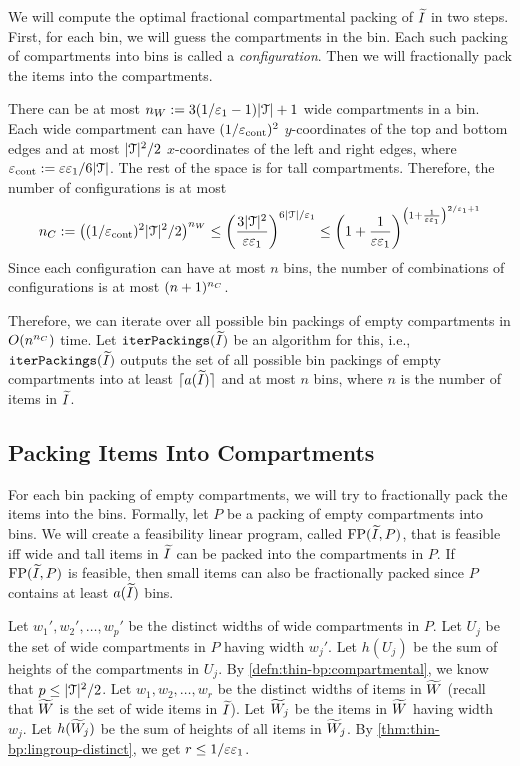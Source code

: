 We will compute the optimal fractional compartmental packing of $\widetilde{I}$ in two steps.
First, for each bin, we will guess the compartments in the bin.
Each such packing of compartments into bins is called a \emph{configuration}.
Then we will fractionally pack the items into the compartments.

There can be at most $n_W := 3(1/\varepsilon_1-1)|\mathcal{T}| + 1$ wide compartments in a bin.
Each wide compartment can have $(1/\varepsilon_{\mathrm{cont}})^2$ $y$-coordinates
of the top and bottom edges and at most $|\mathcal{T}|^2/2$ $x$-coordinates
of the left and right edges, where $\varepsilon_{\mathrm{cont}} := \varepsilon\varepsilon_1/6|\mathcal{T}|$.
The rest of the space is for tall compartments.
Therefore, the number of configurations is at most
\[ n_C := \left((1/\varepsilon_{\mathrm{cont}})^2|\mathcal{T}|^2/2\right)^{n_W}
    \le \left(\frac{3|\mathcal{T}|^2}{\varepsilon\varepsilon_1}\right)^{6|\mathcal{T}|/\varepsilon_1}
    \le \left(1+\frac{1}{\varepsilon\varepsilon_1}\right)^{
        \left(1+\frac{1}{\varepsilon\varepsilon_1}\right)^{2/\varepsilon_1 + 1}} \]
Since each configuration can have at most $n$ bins, the number of combinations
of configurations is at most $(n+1)^{n_C}$.

Therefore, we can iterate over all possible bin packings of empty compartments in $O(n^{n_C})$ time.
Let $\operatorname{\mathtt{iterPackings}}(\widetilde{I})$ be an algorithm for this, i.e.,
$\operatorname{\mathtt{iterPackings}}(\widetilde{I})$ outputs the set of all possible bin packings of empty compartments into
at least $\lceil a(\widetilde{I}) \rceil$ and at most $n$ bins,
where $n$ is the number of items in $\widetilde{I}$.

\subsection{Packing Items Into Compartments}
\label{sec:feas-lp}

For each bin packing of empty compartments, we will try to
fractionally pack the items into the bins.
Formally, let $P$ be a packing of empty compartments into bins.
We will create a feasibility linear program, called $\operatorname{FP}(\widetilde{I}, P)$,
that is feasible iff wide and tall items in $\widetilde{I}$ can be packed
into the compartments in $P$.
If $\operatorname{FP}(\widetilde{I}, P)$ is feasible, then small items can also be
fractionally packed since $P$ contains at least $a(\widetilde{I})$ bins.

Let $w_1', w_2', \ldots, w_p'$ be the distinct widths of wide compartments in $P$.
Let $U_j$ be the set of wide compartments in $P$ having width $w_j'$.
Let $h(U_j)$ be the sum of heights of the compartments in $U_j$.
By \cref{defn:thin-bp:compartmental}, we know that $p \le |\mathcal{T}|^2/2$.
Let $w_1, w_2, \ldots, w_r$ be the distinct widths of items in $\widetilde{W}$
(recall that $\widetilde{W}$ is the set of wide items in $\widetilde{I}$).
Let $\widetilde{W}_j$ be the items in $\widetilde{W}$ having width $w_j$.
Let $h(\widetilde{W}_j)$ be the sum of heights of all items in $\widetilde{W}_j$.
By \cref{thm:thin-bp:lingroup-distinct}, we get $r \le 1/\varepsilon\varepsilon_1$.

